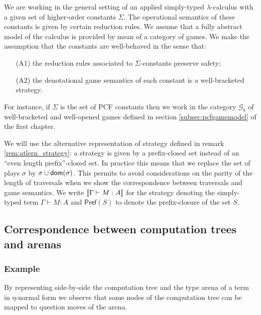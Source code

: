 We are working in the general setting of an applied simply-typed $\lambda$-calculus with a given set of higher-order constants $\Sigma$.
The operational semantics of these constants is given by certain reduction rules.
We assume that a fully abstract model of the calculus is provided by mean of a category of games.
We make the assumption that the constants are well-behaved in the sense that:
\begin{enumerate}
\item[(A1)] the reduction rules associated to $\Sigma$-constants preserve safety;
\item[(A2)] the denotational game semantics of each constant is a well-bracketed strategy.
\end{enumerate}

For instance, if $\Sigma$ is the set of PCF constants then we work in the category $\mathcal{G}_{b}$
of well-bracketed and well-opened games defined in section \ref{subsec:pcfgamemodel} of the first chapter.

We will use the alternative representation of strategy defined in remark \ref{rem:atlern_strategy}: a
strategy is given by a prefix-closed set instead of an ``even length
prefix''-closed set. In practice this means that we replace the set
of plays $\sigma$ by $\sigma \cup \textsf{dom}(\sigma)$. This
permits to avoid considerations on the parity of the length of
traversals when we show the correspondence between traversals and
game semantics. We write ${[\![ \Gamma \vdash M : A ]\!]}$ for the strategy denoting the simply-typed term
$\Gamma \vdash M : A$ and $\textsf{Pref}(S)$ to denote the
prefix-closure of the set $S$.


\subsection{Correspondence between computation trees and arenas}

\subsubsection{Example}
By representing side-by-side the computation tree and the type arena of a term in $\eta$-normal form we observe
that some nodes of the computation tree can be mapped to question moves of the arena.

